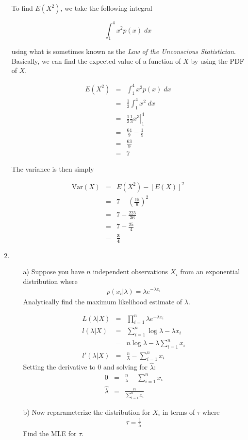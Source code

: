 \documentclass[10pt,a4paper]{article}
\newcommand{\red}{\color{red}}
\newcommand{\black}{\color{black}}
\begin{document}
\begin{enumerate}
To find $E(X^2)$, we take the following integral

\begin{equation*}
 \int_1^4 x^2 p(x) \; dx
\end{equation*}

using what is sometimes known as the \textit{Law of the Unconscious
Statistician}.  Basically, we can find the expected value of a
function of $X$ by using the PDF of $X$.  

\begin{eqnarray*}
 E(X^2) &=& \int_1^4 x^2 p(x) \; dx\\
&=& \frac{1}{3} \int_1^4 x^2 \; dx\\
&=& \frac{1}{3} \left. \frac{1}{3} x^3 \right| ^4_1\\ 
&=& \frac{64}{9} - \frac{1}{9}\\
&=& \frac{63}{9}\\
&=& 7 
\end{eqnarray*} 

The variance is then simply 

\begin{eqnarray*}
 \mathrm{Var}(X) &=& E(X^2) - [E(X)]^2 \\
 &=& 7 - \left( \frac{15}{6} \right) ^ 2 \\
 &=& 7 - \frac{225}{36} \\
 &=& 7 - \frac{25}{4} \\
 &=& \mathbf{\frac{3}{4}}
\end{eqnarray*}
\black 

\bigskip 

\item 
\begin{enumerate}
\item[a)]
Suppose you have $n$ independent observations $X_i$ from an exponential distribution where 
\begin{eqnarray*}
p(x_i | \lambda) = \lambda e^{-\lambda x_i}
\end{eqnarray*}
Analytically find the maximum likelihood estimate of $\lambda$.

\medskip \red
\begin{eqnarray*}
L(\lambda | X) &=& \prod_{i=1}^n \lambda e^{-\lambda x_i} \\
l(\lambda | X) &=& \sum_{i=1}^n \log \lambda - \lambda x_i \\
&=& n \log \lambda - \lambda \sum_{i=1}^n x_i \\
l'(\lambda | X) &=& \frac{n}{\lambda} - \sum_{i=1}^n x_i
\end{eqnarray*}
Setting the derivative to 0 and solving for $\hat{\lambda}$:
\begin{eqnarray*}
0 &=& \frac{n}{\lambda} - \sum_{i=1}^n x_i \\
\hat{\lambda} &=& \frac{n}{\sum_{i=1}^n x_i}
\end{eqnarray*}
\black 
\medskip
\item[b)] Now reparameterize the distribution for $X_i$ in terms of $\tau$ where 
\begin{eqnarray*}
\tau = \frac{1}{\lambda}
\end{eqnarray*}
Find the MLE for $\tau$.


\end{enumerate}
\end{enumerate}
\end{document}
